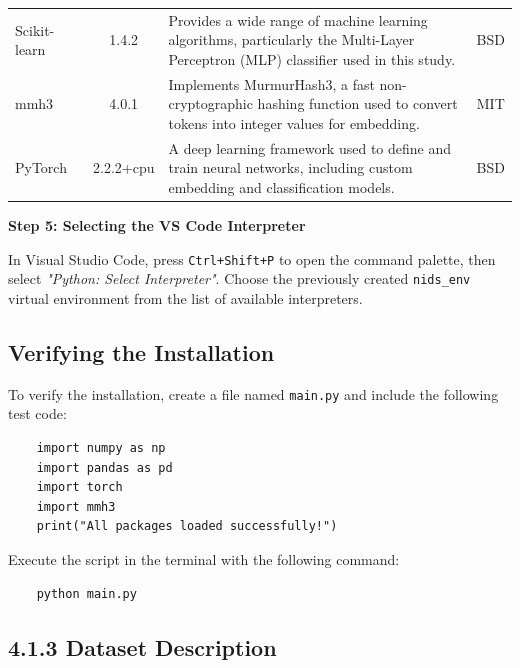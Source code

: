 \begin{ZhChapter}
\begin{table}[htbp]
{{\begin{tabular}{| l | c | p{8cm} | c |}
                    Scikit-learn~\cite{scikit-learn} & 1.4.2     & Provides a wide range of machine learning algorithms, particularly the Multi-Layer Perceptron (MLP) classifier used in this study.                               & BSD            \\
                    mmh3~\cite{mmh3}                 & 4.0.1     & Implements MurmurHash3, a fast non-cryptographic hashing function used to convert tokens into integer values for embedding.                                      & MIT            \\
                    PyTorch~\cite{torch}             & 2.2.2+cpu & A deep learning framework used to define and train neural networks, including custom embedding and classification models.                                        & BSD            \\
                    \hline
                \end{tabular}
            }
        }
    \end{table}

    \textbf{Step 5: Selecting the VS Code Interpreter}

    In Visual Studio Code, press \texttt{Ctrl+Shift+P} to open the command palette, then select \textit{"Python: Select Interpreter"}. Choose the previously created \texttt{nids\_env} virtual environment from the list of available interpreters.

    \subsection{Verifying the Installation}

    To verify the installation, create a file named \texttt{main.py} and include the following test code:
    \begin{verbatim}
    import numpy as np
    import pandas as pd
    import torch
    import mmh3
    print("All packages loaded successfully!")
    \end{verbatim}

    Execute the script in the terminal with the following command:
    \begin{verbatim}
    python main.py
    \end{verbatim}



    \subsection*{4.1.3 Dataset Description}


\end{ZhChapter}
